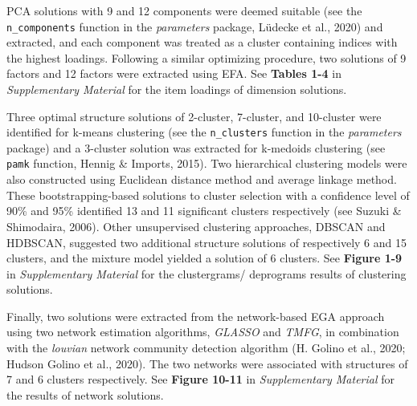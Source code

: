 \documentclass[
  english,
  jou,floatsintext]{apa6}
\begin{document}
PCA solutions with 9 and 12 components were deemed suitable (see the \texttt{n\_components} function in the \emph{parameters} package, Lüdecke et al., 2020) and extracted, and each component was treated as a cluster containing indices with the highest loadings. Following a similar optimizing procedure, two solutions of 9 factors and 12 factors were extracted using EFA. See \textbf{Tables 1-4} in \emph{Supplementary Material} for the item loadings of dimension solutions.

Three optimal structure solutions of 2-cluster, 7-cluster, and 10-cluster were identified for k-means clustering (see the \texttt{n\_clusters} function in the \emph{parameters} package) and a 3-cluster solution was extracted for k-medoids clustering (see \texttt{pamk} function, Hennig \& Imports, 2015). Two hierarchical clustering models were also constructed using Euclidean distance method and average linkage method. These bootstrapping-based solutions to cluster selection with a confidence level of 90\% and 95\% identified 13 and 11 significant clusters respectively (see Suzuki \& Shimodaira, 2006). Other unsupervised clustering approaches, DBSCAN and HDBSCAN, suggested two additional structure solutions of respectively 6 and 15 clusters, and the mixture model yielded a solution of 6 clusters. See \textbf{Figure 1-9} in \emph{Supplementary Material} for the clustergrams/ deprograms results of clustering solutions.

Finally, two solutions were extracted from the network-based EGA approach using two network estimation algorithms, \emph{GLASSO} and \emph{TMFG}, in combination with the \emph{louvian} network community detection algorithm (H. Golino et al., 2020; Hudson Golino et al., 2020). The two networks were associated with structures of 7 and 6 clusters respectively. See \textbf{Figure 10-11} in \emph{Supplementary Material} for the results of network solutions.
\end{document}
